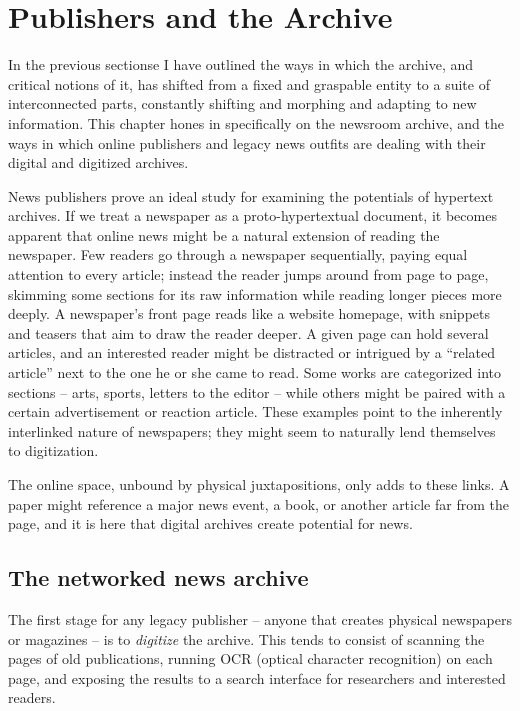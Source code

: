\chapter{Publishers and the Archive}


In the previous sectionse I have outlined the ways in which the archive, and critical notions of it, has shifted from a fixed and graspable entity to a suite of interconnected parts, constantly shifting and morphing and adapting to new information. This chapter hones in specifically on the newsroom archive, and the ways in which online publishers and legacy news outfits are dealing with their digital and digitized archives.

News publishers prove an ideal study for examining the potentials of hypertext archives. If we treat a newspaper as a proto-hypertextual document, it becomes apparent that online news might be a natural extension of reading the newspaper. Few readers go through a newspaper sequentially, paying equal attention to every article; instead the reader jumps around from page to page, skimming some sections for its raw information while reading longer pieces more deeply. A newspaper's front page reads like a website homepage, with snippets and teasers that aim to draw the reader deeper. A given page can hold several articles, and an interested reader might be distracted or intrigued by a ``related article'' next to the one he or she came to read. Some works are categorized into sections -- arts, sports, letters to the editor -- while others might be paired with a certain advertisement or reaction article. These examples point to the inherently interlinked nature of newspapers; they might seem to naturally lend themselves to digitization.

The online space, unbound by physical juxtapositions, only adds to these links. A paper might reference a major news event, a book, or another article far from the page, and it is here that digital archives create potential for news.

\section{The networked news archive}

The first stage for any legacy publisher -- anyone that creates physical newspapers or magazines -- is to \emph{digitize} the archive. This tends to consist of scanning the pages of old publications, running OCR (optical character recognition) on each page, and exposing the results to a search interface for researchers and interested readers.

